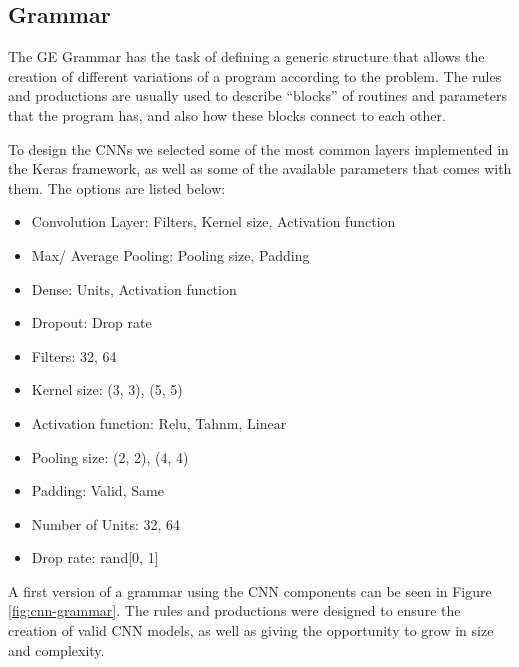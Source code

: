 \documentclass[12pt]{article}
\begin{document}
\subsection{Grammar}


The GE Grammar has the task of defining a generic structure that allows the creation of different variations of a program according to the problem. The rules and productions are usually used to describe ``blocks'' of routines and parameters that the program has, and also how these blocks connect to each other.


To design the CNNs we selected some of the most common layers implemented in the Keras framework, as well as some of the available parameters that comes with them. The options are listed below:


\begin{itemize}
	\item Convolution Layer: Filters, Kernel size, Activation function
	
	\item Max/ Average Pooling: Pooling size, Padding
	
	\item Dense: Units, Activation function
	
	\item Dropout: Drop rate
	
	\item Filters: 32, 64
	
	\item Kernel size: (3, 3), (5, 5)
	
	\item Activation function: Relu, Tahnm, Linear
	
	\item Pooling size: (2, 2), (4, 4)
	
	\item Padding: Valid, Same
	
	\item Number of Units: 32, 64
	
	\item Drop rate: rand[0, 1]
\end{itemize}


A first version of a grammar using the CNN components can be seen in Figure \ref{fig:cnn-grammar}. The rules and productions were designed to ensure the creation of valid CNN models, as well as giving the opportunity to grow in size and complexity.
\end{document}
